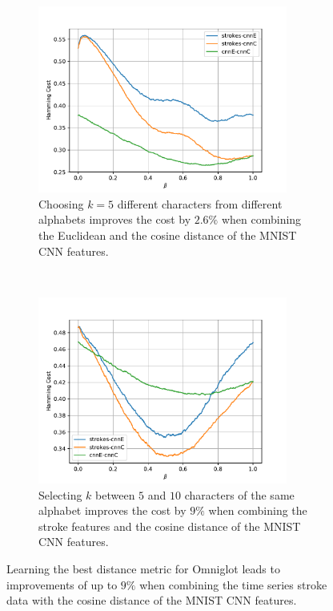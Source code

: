\begin{figure}[H]
  \begin{subfigure}[b]{0.5\textwidth}
    \centering
    \includegraphics[width=0.9\textwidth]{plots/omniglot_MAML_results}
    \caption{Choosing $k=5$ different characters from different alphabets improves the cost by $2.6\%$ when combining the Euclidean and the cosine distance of the MNIST CNN features.}
    \label{fig:dl-omniglot-maml}
  \end{subfigure}\quad
  ~
  \begin{subfigure}[b]{0.5\textwidth}
    \centering
    \includegraphics[width=0.9\textwidth]{plots/omniglot_MD2_results}
    \caption{Selecting $k$ between $5$ and $10$ characters of the same alphabet improves the cost by $9\%$ when combining the stroke features and the cosine distance of the MNIST CNN features.}
    \label{fig:dl-omniglot-md}
  \end{subfigure}
  \caption{Learning the best distance metric for Omniglot leads to improvements of up to $9\%$ when combining the time series stroke data with the cosine distance of the MNIST CNN features.}
  \label{fig:dl-omniglot}
\end{figure}
